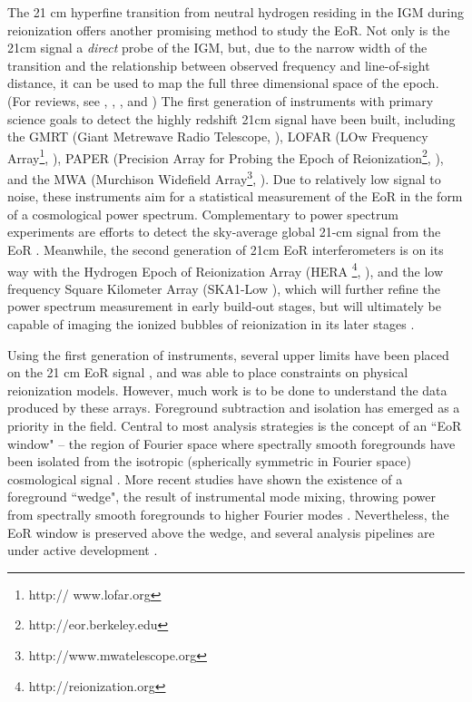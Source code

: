\documentclass[iop]{emulateapj}
\begin{document}
The 21 cm hyperfine transition from neutral hydrogen residing in the IGM during reionization 
offers another promising method to study the EoR. Not only is the 21cm signal a 
\emph{direct} probe of the IGM, but, due to the narrow width of the transition and the 
relationship between observed frequency and line-of-sight distance, it can be used to map 
the full three dimensional space of the epoch. (For reviews, see \citealt{Furlanetto:2006}, 
\citealt{Morales:2010}, \citealt{Zaroubi:2013}, and \citealt{Pritchard:2012}) The first generation of instruments with primary science goals 
to detect the highly redshift 21cm signal have been built, including the GMRT (Giant Metrewave 
Radio Telescope, \citealt{Paciga:2013}), LOFAR (LOw Frequency Array\footnote{http://
www.lofar.org}, \citealt{vanHaarlem:2013, Yatawatta:2013}), PAPER (Precision Array for Probing the Epoch of 
Reionization\footnote{http://eor.berkeley.edu}, \citealt{Parsons:2010}), and the MWA 
(Murchison Widefield Array\footnote{http://www.mwatelescope.org}, \citealt{Tingay:2013, Bowman:2013}). 
Due to relatively low signal to noise, these instruments aim for a statistical measurement of 
the EoR in the form of a cosmological power spectrum. 
Complementary to power spectrum experiments are efforts to detect the sky-average global
21-cm signal from the EoR \citep[e.g.][]{Bowman:2010, Sokolowski:2015, Patra:2013, Voytek:2014}.
Meanwhile, the second generation of
21cm EoR interferometers is on its way with the Hydrogen Epoch of Reionization Array (HERA
\footnote{http://reionization.org}, \citealt{DeBoer:2016}), 
and the low frequency Square Kilometer Array (SKA1-Low \citealt{Mellema:2013}),
which will further 
refine the power spectrum measurement in early build-out stages, but will ultimately be 
capable of imaging the ionized bubbles of reionization in its later stages 
\citep{Beardsley:2015,Malloy:2013}.

Using the first generation of instruments, several upper limits have been placed on the 21 
cm EoR signal \citep{Ali:2015, Dillon:2014, Parsons:2014, Jacobs:2015, Paciga:2013}, and 
\citealt{Pober:2015} was able to place constraints on physical reionization models. 
However, much work is to be done to understand the data produced by these arrays. 
Foreground subtraction and isolation has emerged as a priority in the field. Central to most 
analysis strategies is the concept of an ``EoR window" -- the region of Fourier space where 
spectrally smooth foregrounds have been isolated from the isotropic (spherically symmetric 
in Fourier space) cosmological signal \citep{Morales:2006, Bowman:2009}. More recent 
studies have shown the existence of a foreground ``wedge", the result of instrumental mode 
mixing, throwing power from spectrally smooth foregrounds to higher Fourier modes 
\citep{Thyagarajan:2015b, Thyagarajan:2015, Trott:2012, Liu:2014a, Liu:2014b, 
Hazelton:2013, Pober:2013, Thyagarajan:2013, Vedantham:2012, Morales:2012, Datta:2010}. Nevertheless, 
the EoR window is preserved above the wedge, and 
several analysis pipelines are under active development \citep[e.g. B.~J.~Hazelton et al. 2016, in 
prep; D.~A.~Mitchell et al. 2016, in prep; ][]{Jacobs:2016, Trott:2016, 
Dillon:2013, Trott:2014}.
\end{document}
